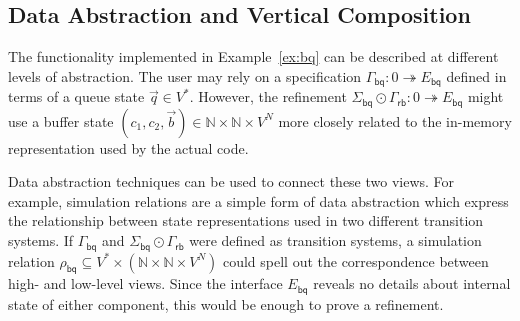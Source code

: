 \documentclass[acmsmall,nonacm]{acmart}
\newcommand{\kw}[1]{\ensuremath{ \mathsf{#1} }}
\newcommand{\emptysig}{0}
\begin{document}




\subsection{Data Abstraction and Vertical Composition} \label{sec:sconv} %


The functionality implemented in Example~\ref{ex:bq}
can be described
at different levels of abstraction.
The user may rely on a specification
$\Gamma_\kw{bq} : \emptysig \twoheadrightarrow E_\kw{bq}$
defined in terms of a queue state $\vec{q} \in V^*$.
However,
the refinement
$\Sigma_\kw{bq} \odot \Gamma_\kw{rb} : \emptysig \twoheadrightarrow E_\kw{bq}$
might use a buffer state
$(c_1, c_2, \vec{b}) \in \mathbb{N} \times \mathbb{N} \times V^N$
more closely related to the
in-memory representation used by the actual code.

Data abstraction techniques
can be used to connect these two views.
For example, simulation relations are a simple form of data abstraction
which express the relationship between state representations used in
two different transition systems.
If $\Gamma_\kw{bq}$ and $\Sigma_\kw{bq} \odot \Gamma_\kw{rb}$
were defined as transition systems, a simulation relation
$\rho_\kw{bq} \subseteq V^* \times (\mathbb{N} \times \mathbb{N} \times V^N)$
could spell out the correspondence between
high- and low-level views.
Since the interface $E_\kw{bq}$ reveals no details about internal state
of either component,
this would be enough to prove a refinement.
\end{document}
